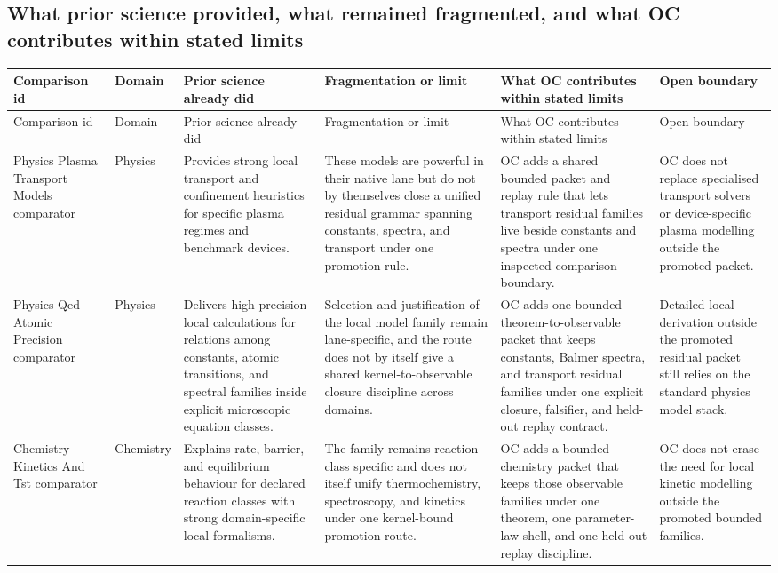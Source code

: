 \subsection{What prior science provided, what remained fragmented, and what OC contributes within stated limits}
\begingroup
\scriptsize
\setlength{\emergencystretch}{1.5em}
\setlength{\tabcolsep}{2pt}
\setlength{\LTleft}{0pt}
\setlength{\LTright}{0pt}
\begin{longtable}{@{}L{0.17\textwidth}L{0.09\textwidth}L{0.17\textwidth}L{0.17\textwidth}L{0.20\textwidth}L{0.14\textwidth}@{}}
\toprule
Comparison id & Domain & Prior science already did & Fragmentation or limit & What OC contributes within stated limits & Open boundary \\
\midrule
\endfirsthead
\toprule
Comparison id & Domain & Prior science already did & Fragmentation or limit & What OC contributes within stated limits & Open boundary \\
\midrule
\endhead
Physics Plasma Transport Models comparator & Physics & Provides strong local transport and confinement heuristics for specific plasma regimes and benchmark devices. & These models are powerful in their native lane but do not by themselves close a unified residual grammar spanning constants, spectra, and transport under one promotion rule. & OC adds a shared bounded packet and replay rule that lets transport residual families live beside constants and spectra under one inspected comparison boundary. & OC does not replace specialised transport solvers or device-specific plasma modelling outside the promoted packet. \\
Physics Qed Atomic Precision comparator & Physics & Delivers high-precision local calculations for relations among constants, atomic transitions, and spectral families inside explicit microscopic equation classes. & Selection and justification of the local model family remain lane-specific, and the route does not by itself give a shared kernel-to-observable closure discipline across domains. & OC adds one bounded theorem-to-observable packet that keeps constants, Balmer spectra, and transport residual families under one explicit closure, falsifier, and held-out replay contract. & Detailed local derivation outside the promoted residual packet still relies on the standard physics model stack. \\
Chemistry Kinetics And Tst comparator & Chemistry & Explains rate, barrier, and equilibrium behaviour for declared reaction classes with strong domain-specific local formalisms. & The family remains reaction-class specific and does not itself unify thermochemistry, spectroscopy, and kinetics under one kernel-bound promotion route. & OC adds a bounded chemistry packet that keeps those observable families under one theorem, one parameter-law shell, and one held-out replay discipline. & OC does not erase the need for local kinetic modelling outside the promoted bounded families. \\

\end{longtable}
